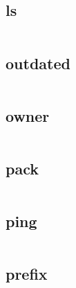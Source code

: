 \begin{lstlisting}[language=bash]

\end{lstlisting}

\subsection{ls}



\begin{lstlisting}[language=bash]

\end{lstlisting}

\subsection{outdated}


\begin{lstlisting}[language=bash]

\end{lstlisting}


\subsection{owner}


\begin{lstlisting}[language=bash]

\end{lstlisting}

\subsection{pack}


\begin{lstlisting}[language=bash]

\end{lstlisting}

\subsection{ping}



\begin{lstlisting}[language=bash]

\end{lstlisting}

\subsection{prefix}


